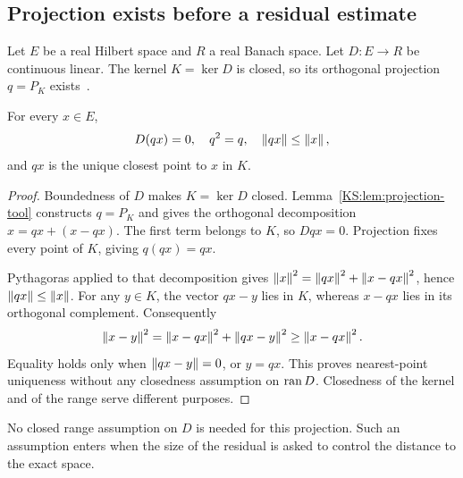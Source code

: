 \label{KS:sec:closed}
\subsection{Projection exists before a residual estimate}
Let \(E\) be a real Hilbert space and \(R\) a real Banach space. Let \(D:E\to R\) be continuous linear. The kernel \(K=\ker D\) is closed, so its orthogonal projection \(q=P_K\) exists~\cite{KS:mathlib-projection}.

\begin{KSproposition}\label{KS:KS42}
For every \(x\in E\),
\[
 D(qx)=0,\quad q^2=q,\quad\left\lVert qx\right\rVert\le\left\lVert x\right\rVert,
\]
and \(qx\) is the unique closest point to \(x\) in \(K\).
\end{KSproposition}
\begin{proof}
Boundedness of \(D\) makes \(K=\ker D\) closed. Lemma~\ref{KS:lem:projection-tool} constructs \(q=P_K\) and gives the orthogonal decomposition \(x=qx+(x-qx)\). The first term belongs to \(K\), so \(Dqx=0\). Projection fixes every point of \(K\), giving \(q(qx)=qx\).

Pythagoras applied to that decomposition gives \(\left\lVert x\right\rVert^2=\left\lVert qx\right\rVert^2+\left\lVert x-qx\right\rVert^2\), hence \(\left\lVert qx\right\rVert\le\left\lVert x\right\rVert\). For any \(y\in K\), the vector \(qx-y\) lies in \(K\), whereas \(x-qx\) lies in its orthogonal complement. Consequently
\[
 \left\lVert x-y\right\rVert^2=\left\lVert x-qx\right\rVert^2+\left\lVert qx-y\right\rVert^2\ge\left\lVert x-qx\right\rVert^2.
\]
Equality holds only when \(\left\lVert qx-y\right\rVert=0\), or \(y=qx\). This proves nearest-point uniqueness without any closedness assumption on \(\operatorname{ran} D\). Closedness of the kernel and of the range serve different purposes.
\end{proof}
No closed range assumption on \(D\) is needed for this projection. Such an assumption enters when the size of the residual is asked to control the distance to the exact space.

